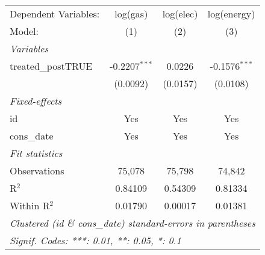 
\begingroup
\centering
\begin{tabular}{lccc}
   \tabularnewline \midrule \midrule
   Dependent Variables: & log(gas)        & log(elec) & log(energy)\\  
   Model:               & (1)             & (2)       & (3)\\  
   \midrule
   \emph{Variables}\\
   treated\_postTRUE    & -0.2207$^{***}$ & 0.0226    & -0.1576$^{***}$\\   
                        & (0.0092)        & (0.0157)  & (0.0108)\\   
   \midrule
   \emph{Fixed-effects}\\
   id                   & Yes             & Yes       & Yes\\  
   cons\_date           & Yes             & Yes       & Yes\\  
   \midrule
   \emph{Fit statistics}\\
   Observations         & 75,078          & 75,798    & 74,842\\  
   R$^2$                & 0.84109         & 0.54309   & 0.81334\\  
   Within R$^2$         & 0.01790         & 0.00017   & 0.01381\\  
   \midrule \midrule
   \multicolumn{4}{l}{\emph{Clustered (id \& cons\_date) standard-errors in parentheses}}\\
   \multicolumn{4}{l}{\emph{Signif. Codes: ***: 0.01, **: 0.05, *: 0.1}}\\
\end{tabular}
\par\endgroup


